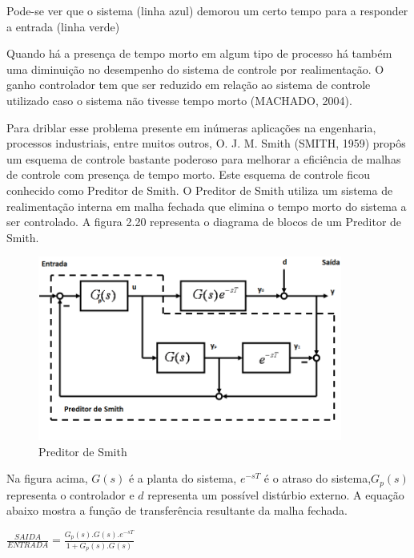 Pode-se ver que o sistema (linha azul) demorou um certo tempo para a responder a entrada (linha verde)

Quando há a presença de tempo morto em algum tipo de processo há também uma diminuição no desempenho do 
sistema de controle por realimentação. O ganho controlador tem que ser reduzido em relação ao sistema de controle utilizado caso o sistema não tivesse tempo morto (MACHADO, 2004).

Para driblar esse problema presente em inúmeras aplicações na engenharia, processos industriais, entre muitos outros,  O. J. M. Smith (SMITH, 1959) propôs um esquema de controle bastante poderoso  para melhorar a eficiência de malhas de controle com presença de tempo morto. Este esquema de controle ficou conhecido como Preditor de Smith. O Preditor de Smith utiliza um sistema de realimentação interna em malha fechada que elimina o tempo morto do sistema a ser controlado. A figura 2.20 representa o diagrama de blocos de um Preditor de Smith.

\begin{figure}[!htb]

\center

\includegraphics[width=10cm]{imagens/Preditor_de_smith.png}

\label{Preditor de Smith}

\caption{Preditor de Smith}

\end{figure}

Na figura acima, $G(s)$ é a planta do sistema, $e^{-sT}$ é o atraso do sistema,$G_p(s)$ representa o controlador e $d$ representa um possível distúrbio externo. A equação abaixo mostra a função de transferência resultante da malha fechada.

\begin{center}

$\frac{SAIDA}{ENTRADA} = \frac{G_p(s).G(s).e^{-sT}}{1+ G_p(s).G(s)}$

\end{center}


